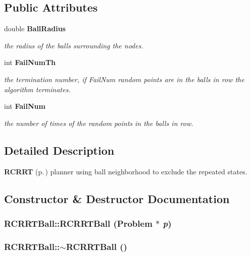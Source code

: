 \subsection*{Public Attributes}
\begin{CompactItemize}
\item 
double {\bf Ball\-Radius}
\begin{CompactList}\small\item\em the radius of the balls surrounding the nodes.\item\end{CompactList}\item 
int {\bf Fail\-Num\-Th}
\begin{CompactList}\small\item\em the termination number, if Fail\-Num random points are in the balls in row the algorithm terminates.\item\end{CompactList}\item 
int {\bf Fail\-Num}
\begin{CompactList}\small\item\em the number of times of the random points in the balls in row.\item\end{CompactList}\end{CompactItemize}


\subsection{Detailed Description}
{\bf RCRRT} {\rm (p.\,\pageref{classRCRRT})} planner using ball neighborhood to exclude the repeated states.



\subsection{Constructor \& Destructor Documentation}
\subsubsection{\setlength{\rightskip}{0pt plus 5cm}RCRRTBall::RCRRTBall ({\bf Problem} $\ast$ {\em p})}\label{classRCRRTBall_a0}


\subsubsection{\setlength{\rightskip}{0pt plus 5cm}RCRRTBall::$\sim$RCRRTBall ()\hspace{0.3cm}{\tt  [inline, virtual]}}\label{classRCRRTBall_a1}




